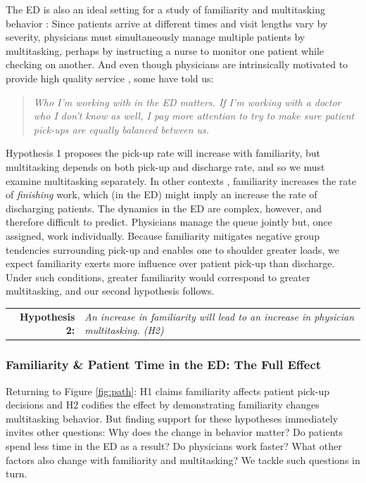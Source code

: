  The ED is also an ideal setting for a study of familiarity and multitasking behavior \citep[p. 169]{KC2014}: Since patients arrive at different times and visit lengths vary by severity, physicians must simultaneously manage multiple patients by multitasking, perhaps by instructing a nurse to monitor one patient while checking on another. And even though physicians are intrinsically motivated to provide high quality service \citep{Madara2015}, some have told us:
 \begin{quote}\textit{Who I'm working with in the ED matters. If I’m working with a doctor who I don’t know as well, I pay more attention to try to make sure patient pick-ups are equally balanced between us.} \end{quote}
 Hypothesis 1 proposes the pick-up rate will increase with familiarity, but multitasking depends on both pick-up and discharge rate, and so we must examine multitasking separately. In other contexts \citep[e.g.,][]{Aksin2020,Reagans2005,Avgerinos2017}, familiarity increases the rate of \textit{finishing} work, which (in the ED) might imply an increase the rate of discharging patients. The dynamics in the ED are complex, however, and therefore difficult to predict. Physicians manage the queue jointly but, once assigned, work individually. Because familiarity mitigates negative group tendencies surrounding pick-up and enables one to shoulder greater loads, we expect familiarity exerts more influence over patient pick-up than discharge. Under such conditions, greater familiarity would correspond to greater multitasking, and our second hypothesis follows.
 
 \medskip \noindent
 \begin{tabularx}{\linewidth}{ r X }
    \textbf{Hypothesis 2:} & \textit{An increase in familiarity will lead to an increase in physician multitasking. (H2)}
 \end{tabularx}   %

 \subsubsection{Familiarity \& Patient Time in the ED: The Full Effect}
 Returning to Figure \ref{fig:path}: H1 claims familiarity affects patient pick-up decisions and H2 codifies the effect by demonstrating familiarity changes multitasking behavior. But finding support for these hypotheses immediately invites other questions: Why does the change in behavior matter? Do patients spend less time in the ED as a result? Do physicians work faster? What other factors also change with familiarity and multitasking? We tackle such questions in turn.
 
